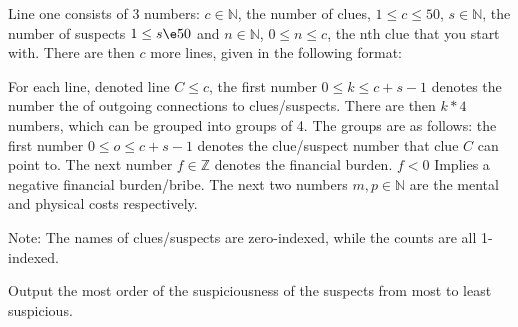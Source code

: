 \par{Line one consists of 3 numbers: $c\in\mathbb{N}$, the number of clues, $1\le c\le50$, $s\in\mathbb{N}$, the number of suspects $1\le s\e50$ and $n\in\mathbb{N}$, $0\le n\le c$, the nth clue that you start with. There are then $c$ more lines, given in the following format:

For each line, denoted line $C\le c$, the first number $0\le k\le c+s-1$ denotes the number the of outgoing connections to clues/suspects. There are then $k*4$ numbers, which can be grouped into groups of 4. The groups are as follows: the first number $0\le o\le c+s-1$ denotes the clue/suspect number that clue $C$ can point to. The next number $f\in\mathbb{Z}$ denotes the financial burden. $f\lt 0$ Implies a negative financial burden/bribe. The next two numbers $m, p\in\mathbb{N}$ are the mental and physical costs respectively. 

Note: The names of clues/suspects are zero-indexed, while the counts are all 1-indexed.
}

\par{Output the most order of the suspiciousness of the suspects from most to least suspicious.}




